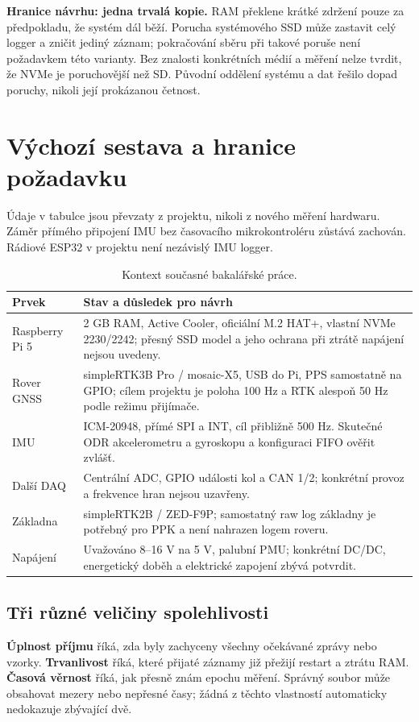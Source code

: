 \documentclass[11pt,a4paper]{article}
\newcommand{\novastrana}{\clearpage}
\begin{document}
\textbf{Hranice návrhu: jedna trvalá kopie.} RAM překlene krátké zdržení pouze za předpokladu, že systém dál běží. Porucha systémového SSD může zastavit celý logger a zničit jediný záznam; pokračování sběru při takové poruše není požadavkem této varianty. Bez znalosti konkrétních médií a měření nelze tvrdit, že NVMe je poruchovější než SD. Původní oddělení systému a dat řešilo dopad poruchy, nikoli její prokázanou četnost.

\novastrana
\section{Výchozí sestava a hranice požadavku}
Údaje v tabulce jsou převzaty z projektu, nikoli z nového měření hardwaru. Záměr přímého připojení IMU bez časovacího mikrokontroléru zůstává zachován. Rádiové ESP32 v projektu není nezávislý IMU logger.\cite{projekt}

\begin{table}[htbp]\centering\small
\caption{Kontext současné bakalářské práce.}
\begin{tabularx}{\textwidth}{L{35mm}Y}
\toprule Prvek & Stav a důsledek pro návrh\\\midrule
Raspberry Pi 5 & 2 GB RAM, Active Cooler, oficiální M.2 HAT+, vlastní NVMe 2230/2242; přesný SSD model a jeho ochrana při ztrátě napájení nejsou uvedeny.\\\addlinespace
Rover GNSS & simpleRTK3B Pro / mosaic-X5, USB do Pi, PPS samostatně na GPIO; cílem projektu je poloha 100 Hz a RTK alespoň 50 Hz podle režimu přijímače.\\\addlinespace
IMU & ICM-20948, přímé SPI a INT, cíl přibližně 500 Hz. Skutečné ODR akcelerometru a gyroskopu a konfiguraci FIFO ověřit zvlášť.\\\addlinespace
Další DAQ & Centrální ADC, GPIO události kol a CAN 1/2; konkrétní provoz a frekvence hran nejsou uzavřeny.\\\addlinespace
Základna & simpleRTK2B / ZED-F9P; samostatný raw log základny je potřebný pro PPK a není nahrazen logem roveru.\\\addlinespace
Napájení & Uvažováno 8--16 V na 5 V, palubní PMU; konkrétní DC/DC, energetický doběh a elektrické zapojení zbývá potvrdit.\\
\bottomrule\end{tabularx}
\end{table}

\subsection{Tři různé veličiny spolehlivosti}
\textbf{Úplnost příjmu} říká, zda byly zachyceny všechny očekávané zprávy nebo vzorky. \textbf{Trvanlivost} říká, které přijaté záznamy již přežijí restart a ztrátu RAM. \textbf{Časová věrnost} říká, jak přesně znám epochu měření. Správný soubor může obsahovat mezery nebo nepřesné časy; žádná z těchto vlastností automaticky nedokazuje zbývající dvě.
\end{document}
